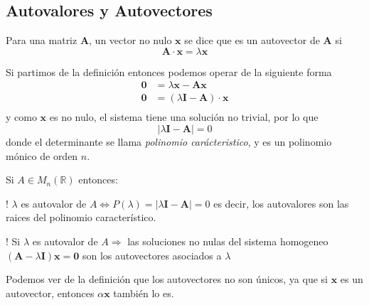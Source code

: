 \subsection{Autovalores y Autovectores}
\begin{definition}
    Para una matriz $ \bm{A} $, un vector no nulo $ \bm{x}$ se dice que 
    es un autovector de $ \bm{A}$ si
    \begin{equation*}
        \bm{A} \cdot \bm{x} = \lambda \bm{x} 
    \end{equation*}
\end{definition}
\begin{obs}
    Si partimos de la definición entonces podemos operar de la siguiente forma
    \begin{equation*}
        \begin{split}
            \bm{0} &= \lambda \bm{x} - \bm{A} \bm{x}\\
            \bm{0} &= (\lambda \bm{I} - \bm{A})\cdot \bm{x}\\
        \end{split}
    \end{equation*}
    y como $\bm{x}$ es no nulo, el sistema tiene una solución no trivial, por lo que
    \begin{equation}
        \label{eqn:autovalores}
        | \lambda \bm{I} - \bm{A} | = 0
    \end{equation}
    donde el determinante se llama \textit{polinomio carácteristico}, y es un polinomio
    mónico de orden $n$. 
\end{obs}

\begin{definition}
    Si $A \in M_n(\mathbb{R})$ entonces:
\end{definition}
\begin{bangenumerate}
    \item! $\lambda$ es autovalor de $A \Leftrightarrow P(\lambda)=  | \lambda \bm{I} - \bm{A} | = 0$
    es decir, los autovalores son las raices del polinomio característico.
    \item! Si $\lambda$ es autovalor de $A \Rightarrow$ las soluciones no nulas
    del sistema homogeneo $(\bm{A}-\lambda \bm{I})\bm{x}=\bm{0}$ son los
    autovectores asociados a $\lambda$
\end{bangenumerate}

\begin{obs}
    Podemos ver de la definición que los autovectores no son únicos, ya que
    si $\bm{x}$ es un autovector, entonces $\alpha\bm{x}$ también lo es.
\end{obs}

